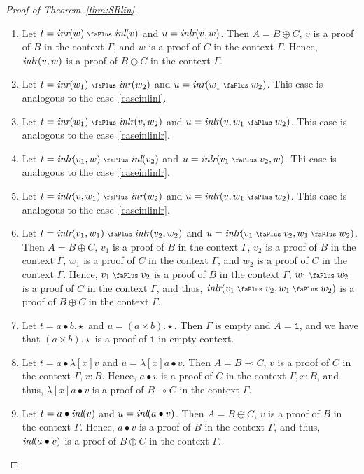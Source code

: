 \documentclass[screen, sigconf,authorversion,nonacm]{acmart}
\theoremstyle{acmdefinition}
\numberwithin{equation}{section}
\newcommand\abstr[1]{[#1]}
\newcommand\inl{\mbox{\it inl}}
\newcommand\inr{\mbox{\it inr}}
\newcommand\inlr{\mbox{\it inlr}}
\newcommand\plus{\mathrel{\text{\normalfont\scalebox{0.7}{\faPlus}}}}
\newcommand\one{\ensuremath{\mathtt 1}}
\begin{document}
\begin{proof}[Proof of Theorem~\ref{thm:SRlin}]
\begin{enumerate}
		\item Let $t=\inr(w) \plus \inl(v)$ and $u=\inlr(v,w)$. Then $A=B\oplus C$, $v$ is a proof of $B$ in the context $\Gamma$, and $w$ is a proof of $C$ in the context $\Gamma$. Hence, $\inlr(v,w)$ is a proof of $B\oplus C$ in the context $\Gamma$.

		\item Let $t=\inr(w_1) \plus \inr(w_2)$ and $u=\inr(w_1 \plus w_2)$. This case is analogous to the case~\ref{caseinlinl}.

		\item Let $t=\inr(w_1) \plus \inlr(v,w_2)$ and $u=\inlr(v,w_1 \plus w_2)$. This case is analogous to the case~\ref{caseinlinlr}.

		\item Let $t=\inlr(v_1,w) \plus \inl(v_2)$ and $u=\inlr(v_1\plus v_2,w)$. Thi case is analogous to the case~\ref{caseinlinlr}.

		\item Let $t=\inlr(v,w_1) \plus \inr(w_2)$ and $u=\inlr(v,w_1 \plus w_2)$. This case is analogous to the case~\ref{caseinlinlr}.

		\item Let $t=\inlr(v_1,w_1) \plus \inlr(v_2,w_2)$ and $u=\inlr(v_1 \plus v_2,w_1 \plus w_2)$. Then $A=B\oplus C$, $v_1$ is a proof of $B$ in the context $\Gamma$, $v_2$ is a proof of $B$ in the context $\Gamma$, $w_1$ is a proof of $C$ in the context $\Gamma$, and $w_2$ is a proof of $C$ in the context $\Gamma$. Hence, $v_1 \plus v_2$ is a proof of $B$ in the context $\Gamma$, $w_1 \plus w_2$ is a proof of $C$ in the context $\Gamma$, and thus, $\inlr(v_1 \plus v_2,w_1 \plus w_2)$ is a proof of $B\oplus C$ in the context $\Gamma$.

		\item Let $t=a \bullet b.\star$ and $u=(a \times b).\star$. Then $\Gamma$ is empty and $A=\one$, and we have that $(a \times b).\star$ is a proof of $\one$ in empty context.

		\item Let $t=a \bullet \lambda \abstr{x} v$ and $u=\lambda \abstr{x} a \bullet v$. Then $A=B\multimap C$, $v$ is a proof of $C$ in the context $\Gamma,x:B$. Hence, $a \bullet v$ is a proof of $C$ in the context $\Gamma,x:B$, and thus, $\lambda \abstr{x} a \bullet v$ is a proof of $B\multimap C$ in the context $\Gamma$.

		\item Let $t=a \bullet \inl(v)$ and $u=\inl(a \bullet v)$. Then $A=B\oplus C$, $v$ is a proof of $B$ in the context $\Gamma$. Hence, $a \bullet v$ is a proof of $B$ in the context $\Gamma$, and thus, $\inl(a \bullet v)$ is a proof of $B\oplus C$ in the context $\Gamma$.


\end{enumerate}
\end{proof}
\end{document}
